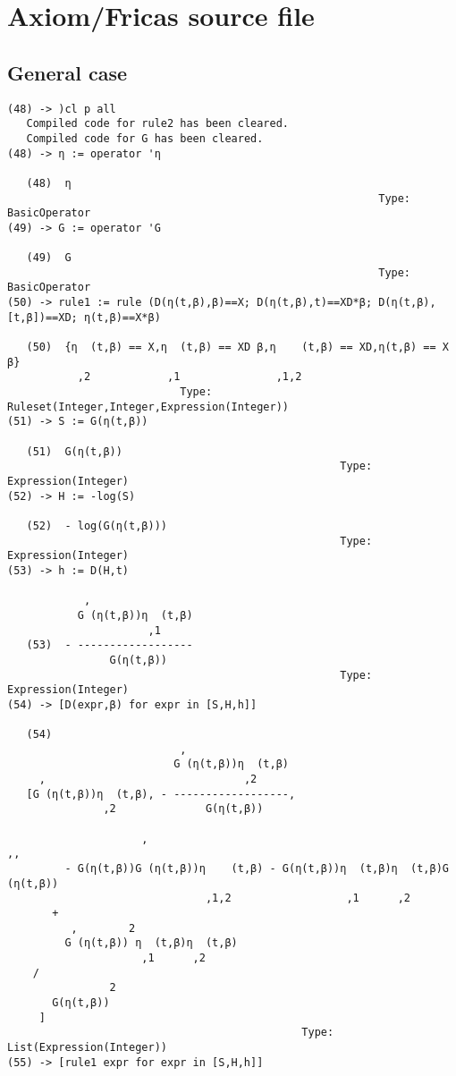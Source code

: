\documentclass[11pt]{article}
\author{Mark Clements}
\date{\today}
\title{}
\begin{document}
\tableofcontents

\section{Axiom/Fricas source file}
\label{sec:orgheadline8}

\subsection{General case}
\label{sec:orgheadline1}

\begin{verbatim}
(48) -> )cl p all
   Compiled code for rule2 has been cleared.
   Compiled code for G has been cleared.
(48) -> η := operator 'η
 
   (48)  η
                                                          Type: BasicOperator
(49) -> G := operator 'G
 
   (49)  G
                                                          Type: BasicOperator
(50) -> rule1 := rule (D(η(t,β),β)==X; D(η(t,β),t)==XD*β; D(η(t,β),[t,β])==XD; η(t,β)==X*β)
 
   (50)  {η  (t,β) == X,η  (t,β) == XD β,η    (t,β) == XD,η(t,β) == X β}
           ,2            ,1               ,1,2
                           Type: Ruleset(Integer,Integer,Expression(Integer))
(51) -> S := G(η(t,β))
 
   (51)  G(η(t,β))
                                                    Type: Expression(Integer)
(52) -> H := -log(S)
 
   (52)  - log(G(η(t,β)))
                                                    Type: Expression(Integer)
(53) -> h := D(H,t)
 
            ,
           G (η(t,β))η  (t,β)
                      ,1
   (53)  - ------------------
                G(η(t,β))
                                                    Type: Expression(Integer)
(54) -> [D(expr,β) for expr in [S,H,h]]
 
   (54)
                           ,
                          G (η(t,β))η  (t,β)
     ,                               ,2
   [G (η(t,β))η  (t,β), - ------------------,
               ,2              G(η(t,β))

                     ,                                               ,,
         - G(η(t,β))G (η(t,β))η    (t,β) - G(η(t,β))η  (t,β)η  (t,β)G  (η(t,β))
                               ,1,2                  ,1      ,2
       + 
          ,        2
         G (η(t,β)) η  (t,β)η  (t,β)
                     ,1      ,2
    /
                2
       G(η(t,β))
     ]
                                              Type: List(Expression(Integer))
(55) -> [rule1 expr for expr in [S,H,h]]
 

\end{verbatim}
\end{document}

